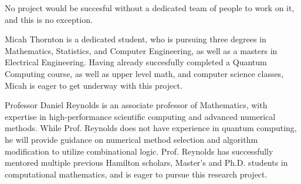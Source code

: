 No project would be succesful without a dedicated team of people to work on it, and this is no exception. 

Micah Thornton is a dedicated student, who is pursuing three degrees in Mathematics, Statistics, and Computer Engineering, as well as a masters in Electrical Engineering. Having already succesfully completed a Quantum Computing course, as well as upper level math, and computer science classes, Micah is eager to get underway with this project. 

Professor Daniel Reynolds is an associate professor of Mathematics, with expertise in high-performance scientific computing and advanced numerical methods.  While Prof. Reynolds does not have experience in quantum computing, he will provide guidance on numerical method selection and algorithm modification to utilize combinational logic.  Prof. Reynolds has successfully mentored multiple previous Hamilton scholars, Master's and Ph.D. students in computational mathematics, and is eager to pursue this research project.